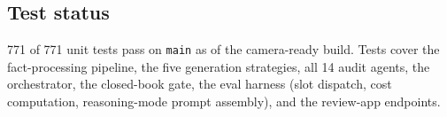 \subsection{Test status}

771 of 771 unit tests pass on \texttt{main} as of the camera-ready
build. Tests cover the fact-processing pipeline, the five generation
strategies, all 14 audit agents, the orchestrator, the closed-book
gate, the eval harness (slot dispatch, cost computation,
reasoning-mode prompt assembly), and the review-app endpoints.
